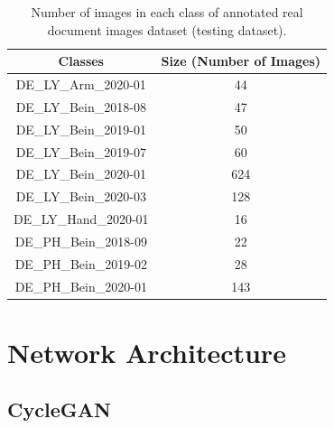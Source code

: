 \begin{center}
    \begin{table}[H]
    \begin{center}
    \begin{tabular}{||c c||} 
    \hline
    \textbf{Classes} & \textbf{Size (Number of Images)}\\ [0.5ex] 
    \hline\hline
    DE\_LY\_Arm\_2020-01 & 44 \\ 
    \hline
    DE\_LY\_Bein\_2018-08 & 47 \\
    \hline
    DE\_LY\_Bein\_2019-01 & 50 \\
    \hline
    DE\_LY\_Bein\_2019-07&  60\\
    \hline
    DE\_LY\_Bein\_2020-01&  624\\
    \hline
    DE\_LY\_Bein\_2020-03&  128\\
    \hline
    DE\_LY\_Hand\_2020-01&  16\\
    \hline
    DE\_PH\_Bein\_2018-09&  22\\
    \hline
    DE\_PH\_Bein\_2019-02&  28\\
    \hline    
    DE\_PH\_Bein\_2020-01&  143\\
    \hline    
    \end{tabular}
    \end{center}
    \caption[Number of images in each class of annotated real document images dataset.]{Number of images in each class of annotated real document images dataset (testing dataset).}
    \label{table:testdataset}
    \end{table}
\end{center}


\section{Network Architecture}\label{NetworkArchitecture}

\subsection{\ac{CycleGAN}}

